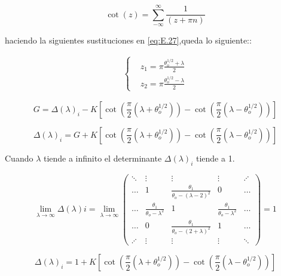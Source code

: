 \begin{equation}\label{eq:E.27}
    \cot(z)=\sum^{\infty}_{-\infty}\frac{1}{(z+\pi n)}
\end{equation}

haciendo la siguientes sustituciones en \ref{eq:E.27},queda lo siguiente::

\begin{equation}\label{eq:E.28}
\begin{aligned}
\begin{cases}
&z_1=\pi \frac{\theta_o^{1/2}+\lambda}{2}\\
&z_2=\pi \frac{\theta_o^{1/2}-\lambda}{2}
\end{cases}
\end{aligned}
\end{equation}

 \begin{equation}\label{eq:E.29}
     G=\Delta(\lambda)_{i}-K\left[\cot(\frac{\pi}{2}(\lambda+\theta_o^{1/2}))-\cot(\frac{\pi}{2}(\lambda-\theta_o^{1/2}))\right]
 \end{equation}

\begin{equation}\label{eq:E.30}
     \Delta(\lambda)_{i}=G+K[\cot(\frac{\pi}{2}(\lambda+\theta_o^{1/2}))-\cot(\frac{\pi}{2}(\lambda-\theta_o^{1/2}))]
 \end{equation}
 
 Cuando $\lambda$ tiende a infinito el determinante $\Delta(\lambda)_{i}$ tiende a 1.
 
 \large
\begin{equation}\label{eq:E.31}
\lim_{\lambda\rightarrow \infty}\Delta(\lambda){i}=\lim_{\lambda\rightarrow\infty} 
\begin{pmatrix}
\ddots & \vdots & \vdots & \vdots & \iddots \\
\dots & 1 & \frac{\theta_1}{\theta_o-(\lambda-2)^2} & 0 & \dots \\ 
\dots  & \frac{\theta_1}{\theta_o-\lambda^2} & 1 & \frac{\theta_1}{\theta_o-\lambda^2} &\dots\\
 \dots  & 0 & \frac{\theta_1}{\theta_o- (2+\lambda)^2} & 1 & \dots\\ 
 \iddots & \vdots & \vdots & \vdots & \ddots
\end{pmatrix}=1
\end{equation}
\normalsize
 
 \begin{equation}\label{eq:2.27}
     \Delta(\lambda)_{i}=1+K[\cot(\frac{\pi}{2}(\lambda+\theta_o^{1/2}))-\cot(\frac{\pi}{2}(\lambda-\theta_o^{1/2}))]
 \end{equation}
  
